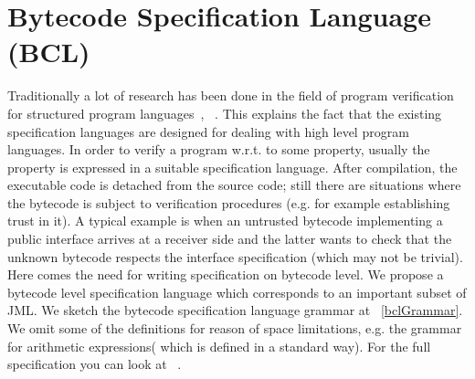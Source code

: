 
\section{Bytecode Specification Language (BCL)}\label{bcSpecLg}
Traditionally a lot of research has been done in the field of program verification for structured program languages~\cite{WPCDS},
~\cite{DisDij}. This explains the fact that the existing specification languages are designed for dealing with high level program languages. In order to verify 
a program w.r.t. to some property, usually the property is expressed in a suitable specification language.
After compilation, the executable code is detached from the source code; still there are situations where the bytecode is subject to verification procedures (e.g. for example establishing trust in it). A typical example is when an untrusted bytecode implementing a public interface arrives at a 
receiver side and the latter wants to check that the unknown  bytecode respects the interface specification (which may not be trivial). Here comes the need for writing specification on  bytecode level. 
We propose a bytecode level specification language which corresponds to an important subset of JML.
We sketch the bytecode specification language grammar at \fig~\ref{bclGrammar}. We omit some of the definitions for reason of space limitations,
 e.g. the grammar for arithmetic expressions( which is defined in a standard way). For the full specification you can look at ~\cite{JML2BCSpec}.  
